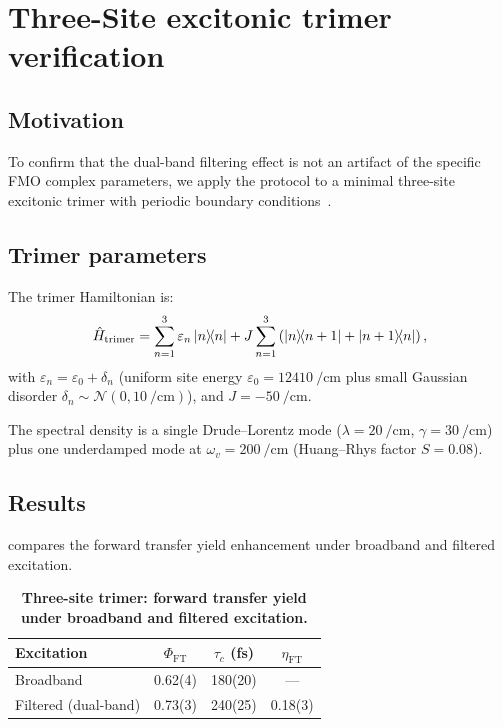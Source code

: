 \documentclass[11pt,a4paper]{article}
\begin{document}
\section{Three-Site excitonic trimer verification}
\label{SI-sec:3site}

\subsection{Motivation}

To confirm that the dual-band filtering effect is not an artifact of the specific FMO complex parameters, we apply the protocol to a minimal three-site excitonic trimer with periodic boundary conditions~\cite{Mohseni2008,Rebentrost2009,Chin2010}.

\subsection{Trimer parameters}

The trimer Hamiltonian is:
\begin{equation}
\hat{H}_{\mathrm{trimer}} = \sum_{n=1}^{3} \varepsilon_n \dyad{n} + J \sum_{n=1}^{3} \left( \dyad{n}{n+1} + \dyad{n+1}{n} \right),
\label{eq:SI_trimer_hamiltonian}
\end{equation}
with $\varepsilon_n = \varepsilon_0 + \delta_n$ (uniform site energy $\varepsilon_0 = \qty{12410}{\per\cm}$ plus small Gaussian disorder $\delta_n \sim \mathcal{N}(0, \qty{10}{\per\cm})$), and $J = \qty{-50}{\per\cm}$.

The spectral density is a single Drude--Lorentz mode ($\lambda = \qty{20}{\per\cm}$, $\gamma = \qty{30}{\per\cm}$) plus one underdamped mode at $\omega_v = \qty{200}{\per\cm}$ (Huang--Rhys factor $S = 0.08$).

\subsection{Results}

 compares the forward transfer yield enhancement under broadband and filtered excitation.

\begin{table}[htbp]
\centering
\caption{\textbf{Three-site trimer: forward transfer yield under broadband and filtered excitation.}}
\label{tab:SI_trimer_results}
\begin{tabular}{l S[table-format=1.2(1)] S[table-format=3.0(2)] S[table-format=1.2(1)]}
\toprule
Excitation & {$\Phi_{\mathrm{FT}}$} & {$\tau_c$ (fs)} & {$\eta_{\mathrm{FT}}$} \\
\midrule
Broadband & 0.62(4) & 180(20) & {---} \\
Filtered (dual-band) & 0.73(3) & 240(25) & 0.18(3) \\
\bottomrule
\end{tabular}
\end{table}
\end{document}
